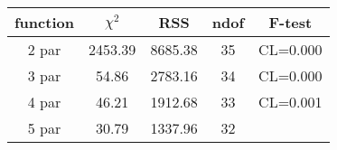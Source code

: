 \begin{tabular}{c|c|c|c|c}
function & $\chi^2$ & RSS & ndof & F-test \\
\hline
2 par & 2453.39 & 8685.38 & 35 & CL=0.000 \\
3 par & 54.86 & 2783.16 & 34 & CL=0.000 \\
4 par & 46.21 & 1912.68 & 33 & CL=0.001 \\
5 par & 30.79 & 1337.96 & 32 & \\
\hline
\end{tabular}